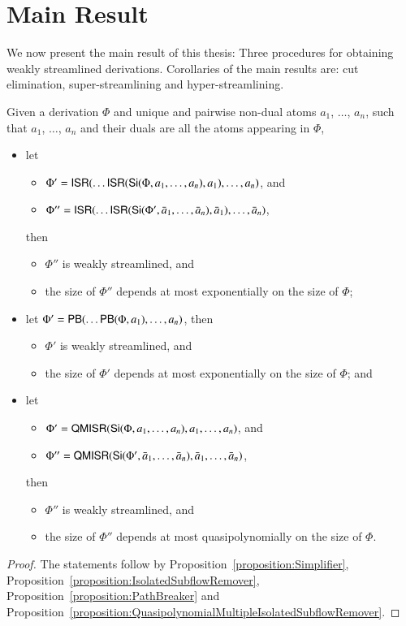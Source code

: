\section{Main Result}\label{section:MainResult}

We now present the main result of this thesis: Three procedures for obtaining weakly streamlined derivations. Corollaries of the main results are: cut elimination, super-streamlining and hyper-streamlining.

\begin{theorem}\label{theorem:WeakStreamlining}
Given a derivation $\Phi$ and unique and pairwise non-dual atoms $a_1$, $\dots$, $a_n$, such that $a_1$, $\dots$, $a_n$ and their duals are all the atoms appearing in $\Phi$,
\begin{itemize}
\item let
\begin{itemize}
\item $\Phi'=\mathsf{ISR}(\dots\mathsf{ISR}(\mathsf{Si}(\Phi,a_1,\dots,a_n),a_1),\dots,a_n)$, and
\item $\Phi''=\mathsf{ISR}(\dots\mathsf{ISR}(\mathsf{Si}(\Phi',\bar a_1,\dots,\bar a_n),\bar a_1),\dots,\bar a_n)$,
\end{itemize}
then
\begin{itemize}
\item $\Phi''$ is weakly streamlined, and
\item the size of $\Phi''$ depends at most exponentially on the size of\/ $\Phi$;
\end{itemize}
\item let\/ $\Phi'=\mathsf{PB}(\dots\mathsf{PB}(\Phi,a_1),\dots,a_n)$, then
\begin{itemize}
\item $\Phi'$ is weakly streamlined, and
\item the size of\/ $\Phi'$ depends at most exponentially on the size of\/ $\Phi$; and
\end{itemize}
\item let
\begin{itemize}
\item $\Phi'=\mathsf{QMISR}(\mathsf{Si}(\Phi,a_1,\dots,a_n),a_1,\dots,a_n)$, and
\item $\Phi''=\mathsf{QMISR}(\mathsf{Si}(\Phi',\bar a_1,\dots,\bar a_n),\bar a_1,\dots,\bar a_n)$,
\end{itemize}
then
\begin{itemize}
\item $\Phi''$ is weakly streamlined, and
\item the size of\/ $\Phi''$ depends at most quasipolynomially on the size of\/ $\Phi$.
\end{itemize}
\end{itemize}
\end{theorem}

\begin{proof}
The statements follow by Proposition~\vref{proposition:Simplifier}, Proposition~\vref{proposition:IsolatedSubflowRemover}, Proposition~\vref{proposition:PathBreaker} and Proposition~\vref{proposition:QuasipolynomialMultipleIsolatedSubflowRemover}.
\end{proof}
